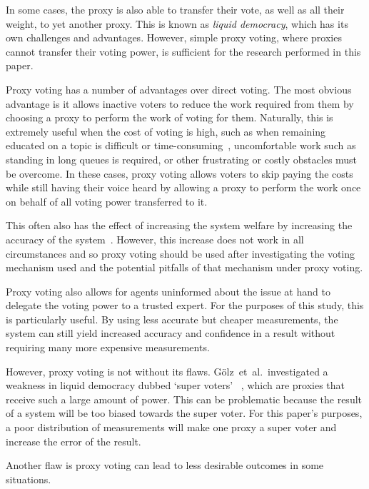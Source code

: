 In some cases, the proxy is also able to transfer their vote, as well as all
their weight, to yet another proxy.
This is known as \textit{liquid democracy}, which has its own challenges and
advantages.
However, simple proxy voting, where proxies cannot transfer their voting power,
is sufficient for the research performed in this paper.

Proxy voting has a number of advantages over direct voting.
The most obvious advantage is it allows inactive voters to reduce the work
required from them by choosing a proxy to perform the work of voting for them.
Naturally, this is extremely useful when the cost of voting is high, such as
when remaining educated on a topic is difficult or
time-consuming~\cite[para 1.1]{Mueller1972}, uncomfortable work such as standing
in long queues is required, or other frustrating or costly obstacles must be
overcome.
In these cases, proxy voting allows voters to skip paying the costs while still
having their voice heard by allowing a proxy to perform the work once on behalf
of all voting power transferred to it.

This often also has the effect of increasing the system welfare by
increasing the accuracy of the system~\cite[sec. 1.1]{Cohensius2017}.
However, this increase does not work in all circumstances and so proxy voting
should be used after investigating the voting mechanism used and the potential
pitfalls of that mechanism under proxy voting.

Proxy voting also allows for agents uninformed about the issue at hand to
delegate the voting power to a trusted expert.
For the purposes of this study, this is particularly useful.
By using less accurate but cheaper measurements, the system can still yield
increased accuracy and confidence in a result without requiring many more
expensive measurements.

However, proxy voting is not without its flaws.
Gölz~et~al.\ investigated a weakness in liquid democracy dubbed `super voters'
~\cite[para. 1.3]{Golz2021}, which are proxies that receive such a large amount
of power.
This can be problematic because the result of a system will be too biased
towards the super voter.
For this paper's purposes, a poor distribution of measurements will make one
proxy a super voter and increase the error of the result.

Another flaw is proxy voting can lead to less desirable outcomes in some
situations.





